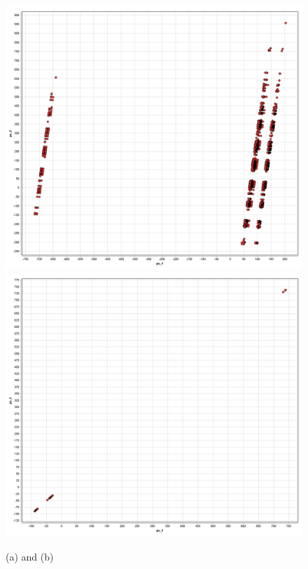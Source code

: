 \documentclass [11pt]{article}
\begin{document}
\begin{figure}[h]
\centering
\includegraphics[totalheight=0.25\textheight]{./figures/PCA-PAper.png}\includegraphics[totalheight=0.25\textheight]{./figures/PCA_User1.png}
\caption{(a) and (b)}

\end{figure}
\end{document}
